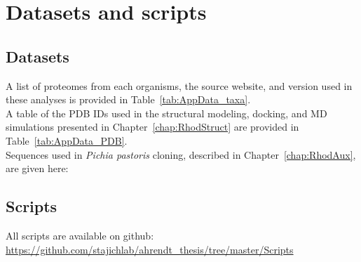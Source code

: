 \chapter{Datasets and scripts}
\label{app:Data}
\section*{Datasets}
A list of proteomes from each organisms, the source website, and version used in these analyses is provided in Table~\ref{tab:AppData_taxa}.\\
A table of the PDB IDs used in the structural modeling, docking, and MD simulations presented in Chapter~\ref{chap:RhodStruct} are provided in Table~\ref{tab:AppData_PDB}.\\
Sequences used in \textit{Pichia pastoris} cloning, described in Chapter~\ref{chap:RhodAux}, are given here:\\
\section*{Scripts}
All scripts are available on github: \url{https://github.com/stajichlab/ahrendt_thesis/tree/master/Scripts}
